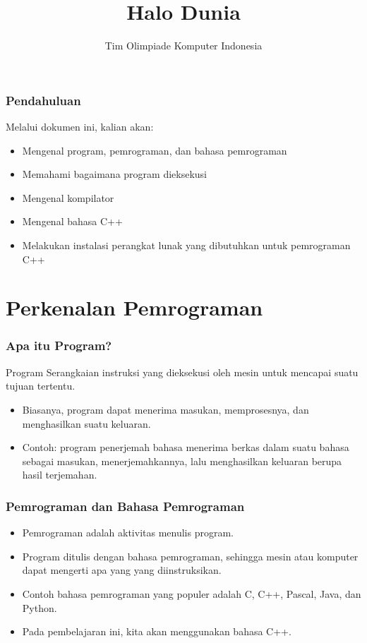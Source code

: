 

\title{Halo Dunia}
\author{Tim Olimpiade Komputer Indonesia}
\date{}

\newcommand{\compilehelo}{\texttt{g++ -o prog halo.cpp}}



\begin{frame}
\titlepage
\end{frame}

\begin{frame}
\frametitle{Pendahuluan}
Melalui dokumen ini, kalian akan:
\begin{itemize}
  \item Mengenal program, pemrograman, dan bahasa pemrograman
  \item Memahami bagaimana program dieksekusi
  \item Mengenal kompilator
  \item Mengenal bahasa C++
  \item Melakukan instalasi perangkat lunak yang dibutuhkan untuk pemrograman C++
\end{itemize}
\end{frame}

\section{Perkenalan Pemrograman}
\frame{\sectionpage}

\begin{frame}
\frametitle{Apa itu Program?}
\begin{block}{Program}
  Serangkaian instruksi yang dieksekusi oleh mesin untuk mencapai suatu tujuan tertentu.
\end{block}
\begin{itemize}
  \item Biasanya, program dapat menerima masukan, memprosesnya, dan menghasilkan suatu keluaran.
  \item Contoh: program penerjemah bahasa menerima berkas dalam suatu bahasa sebagai masukan, menerjemahkannya, lalu menghasilkan keluaran berupa hasil terjemahan.
\end{itemize}
\end{frame}

\begin{frame}
\frametitle{Pemrograman dan Bahasa Pemrograman}
\begin{itemize}
  \item Pemrograman adalah aktivitas menulis program.
  \item Program ditulis dengan bahasa pemrograman, sehingga mesin atau komputer dapat mengerti apa yang yang diinstruksikan.
  \item Contoh bahasa pemrograman yang populer adalah C, C++, Pascal, Java, dan Python.
  \item Pada pembelajaran ini, kita akan menggunakan bahasa C++.
\end{itemize}
\end{frame}

